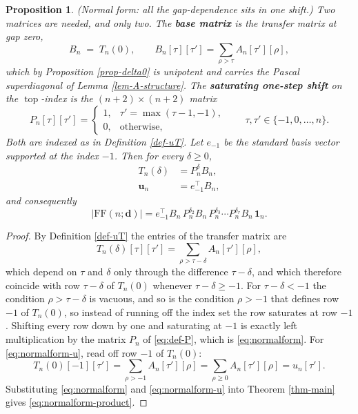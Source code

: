 \documentclass[11pt, a4paper, abstract=yes]{scrartcl}
\theoremstyle{definition}
\theoremstyle{remark}
\theoremstyle{plain}
\newtheorem{proposition}[definition]{Proposition}
\newcommand{\vek}[1]{\boldsymbol{#1}}
\newcommand{\tp}{\operatorname{top}}
\begin{document}
\begin{proposition}
(\emph{Normal form: all the gap-dependence sits in one shift.}) Two matrices are needed, and only two. The
\textbf{base matrix} is the transfer matrix at gap zero,
\begin{equation}\label{eq:def-B}
  B_n\;=\;T_n(0),\qquad B_n[\tau][\tau']=\sum_{\rho>\tau}A_n[\tau'][\rho] ,
\end{equation}
which by Proposition \ref{prop-delta0} is unipotent and carries the Pascal superdiagonal of
Lemma \ref{lem-A-structure}. The \textbf{saturating one-step shift} on the \(\tp\)-index is the
\((n+2)\times(n+2)\) matrix
\begin{equation}\label{eq:def-P}
  P_n[\tau][\tau']=\begin{cases}
    1, & \tau'=\max(\tau-1,-1),\\
    0, & \text{otherwise},
  \end{cases}
  \qquad \tau,\tau'\in\lbrace-1,0,\dots,n\rbrace .
\end{equation}
Both are indexed as in Definition \ref{def-uT}. Let \(e_{-1}\) be the standard basis vector supported at
the index \(-1\). Then for every \(\delta\ge0\),
\begin{align}
  T_n(\delta) &= P_n^{\delta}B_n ,\label{eq:normalform}\\
  \vek u_n    &= e_{-1}^{\!\top}B_n ,\label{eq:normalform-u}
\end{align}
and consequently
\begin{equation}\label{eq:normalform-product}
  \lvert\mathrm{FF}(n;\vek d)\rvert
   =e_{-1}^{\!\top}B_n\,P_n^{\delta_2}B_n\,P_n^{\delta_3}\cdots P_n^{\delta_r}B_n\,\vek 1_n .
\end{equation}
\label{prop-normalform}
\end{proposition}

\begin{proof}
By Definition \ref{def-uT} the entries of the transfer matrix are
\begin{equation*}
  T_n(\delta)[\tau][\tau']=\sum_{\rho>\tau-\delta}A_n[\tau'][\rho] ,
\end{equation*}
which depend on \(\tau\) and \(\delta\) only through the difference \(\tau-\delta\), and which
therefore coincide with row \(\tau-\delta\) of \(T_n(0)\) whenever \(\tau-\delta\ge-1\). For
\(\tau-\delta<-1\) the condition \(\rho>\tau-\delta\) is vacuous, and so is the condition
\(\rho>-1\) that defines row \(-1\) of \(T_n(0)\), so instead of running off the index set the row
saturates at row \(-1\). Shifting every row down by one and saturating at \(-1\) is exactly left
multiplication by the matrix \(P_n\) of \eqref{eq:def-P}, which is \eqref{eq:normalform}. For
\eqref{eq:normalform-u}, read off row \(-1\) of \(T_n(0)\):
\begin{equation*}
  T_n(0)[-1][\tau']=\sum_{\rho>-1}A_n[\tau'][\rho]=\sum_{\rho\ge0}A_n[\tau'][\rho]=u_n[\tau'] .
\end{equation*}
Substituting \eqref{eq:normalform} and \eqref{eq:normalform-u} into Theorem \ref{thm-main} gives
\eqref{eq:normalform-product}.
\end{proof}
\end{document}
